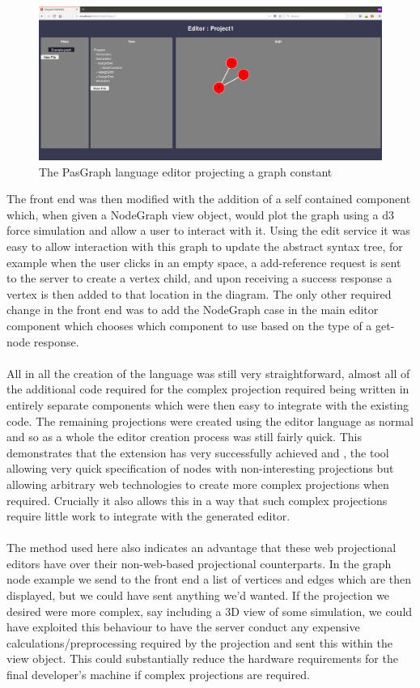 \documentclass{article}
\begin{document}
\begin{figure}[h!]
  \centering
  \includegraphics[width=\linewidth]{./Screenshots/graphUI2.png}
  \caption{The PasGraph language editor projecting a graph constant}
  \label{fig:pasgraphUI2}
\end{figure}
The front end was then modified with the addition of a self contained component which, when given a NodeGraph view object, would plot the graph using a d3 force simulation and allow a user to interact with it. Using the edit service it was easy to allow interaction with this graph to update the abstract syntax tree, for example when the user clicks in an empty space, a add-reference request is sent to the server to create a vertex child, and upon receiving a success response a vertex is then added to that location in the diagram. The only other required change in the front end was to add the NodeGraph case in the main editor component which chooses which component to use based on the type of a get-node response.
\\
\\
All in all the creation of the language was still very straightforward, almost all of the additional code required for the complex projection required being written in entirely separate components which were then easy to integrate with the existing code. The remaining projections were created using the editor language as normal and so as a whole the editor creation process was still fairly quick. This demonstrates that the extension has very successfully achieved \RSetup and \RCustom, the tool allowing very quick specification of nodes with non-interesting projections but allowing arbitrary web technologies to create more complex projections when required. Crucially it also allows this in a way that such complex projections require little work to integrate with the generated editor. 
\\
\\
The method used here also indicates an advantage that these web projectional editors have over their non-web-based projectional counterparts. In the graph node example we send to the front end a list of vertices and edges which are then displayed, but we could have sent anything we'd wanted. If the projection we desired were more complex, say including a 3D view of some simulation, we could have exploited this behaviour to have the server conduct any expensive calculations/preprocessing required by the projection and sent this within the view object. This could substantially reduce the hardware requirements for the final developer's machine if complex projections are required.
\end{document}
